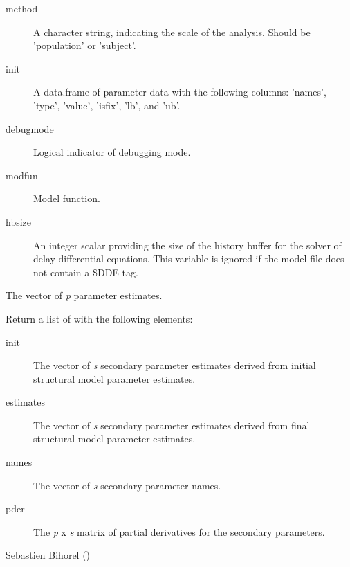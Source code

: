 \begin{Arguments}
\begin{ldescription}
\begin{description}
\item[method] A character string, indicating the scale of the analysis. Should
be 'population' or 'subject'.
\item[init] A data.frame of parameter data with the following columns:
'names', 'type', 'value', 'isfix', 'lb', and 'ub'.
\item[debugmode] Logical indicator of debugging mode.
\item[modfun] Model function.
\item[hbsize] An integer scalar providing the size of the history buffer for
the solver of delay differential equations. This variable is ignored if
the model file does not contain a \$DDE tag.

\end{description}


\item[\code{x}] The vector of \emph{p} parameter estimates.
\end{ldescription}
\end{Arguments}
%
\begin{Value}
Return a list of with the following elements:\begin{description}

\item[init] The vector of \emph{s} secondary parameter estimates derived
from initial structural model parameter estimates.
\item[estimates] The vector of \emph{s} secondary parameter estimates
derived from final structural model parameter estimates.
\item[names] The vector of \emph{s} secondary parameter names.
\item[pder] The \emph{p} x \emph{s} matrix of partial derivatives for the
secondary parameters.

\end{description}

\end{Value}
%
\begin{Author}\relax
Sebastien Bihorel ()
\end{Author}
%
\begin{SeeAlso}\relax
{}
\end{SeeAlso}
